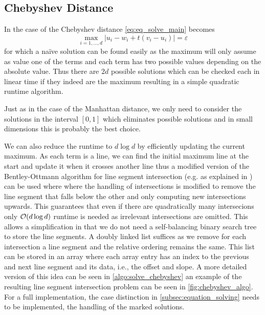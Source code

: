 \subsection{Chebyshev Distance}
\label{subsubsec:eq_chebyshev_distance}
In the case of the Chebyshev distance \cref{eq:eq_solve_main} becomes 
\begin{equation}
  \max_{i = 1,\dots, d} |u_i - w_i + t(v_i - u_i)| = \varepsilon\label{eq:solve_chebyshev}
\end{equation}
for which a na\"ive solution can be found easily as the maximum will only assume as value one of the terms and each term has two possible values depending on the absolute value. Thus there are \(2d\) possible solutions which can be checked each in linear time if they indeed are the maximum resulting in a simple quadratic runtime algorithm. 

Just as in the case of the Manhattan distance, we only need to consider the solutions in the interval \([0,1]\) which eliminates possible solutions and in small dimensions this is probably the best choice. 

We can also reduce the runtime to \(d \log d\) by efficiently updating the current maximum. As each term is a line, we can find the initial maximum line at the start and update it when it crosses another line thus a modified version of the Bentley-Ottmann algorithm for line segment intersection (e.g. as explained in \cite{computational_geometry}) can be used where where the handling of intersections is modified to remove the line segment that falls below the other and only computing new intersections upwards. This guarantees that even if there are quadratically many intersecions only \(\mathcal{O}(d \log d)\) runtime is needed as irrelevant intersections are omitted. 
This allows a simplification in that we do not need a self-balancing binary search tree to store the line segments. A doubly linked list suffices as we remove for each intersection a line segment and the relative ordering remains the same. This list can be stored in an array where each array entry has an index to the previous and next line segment and its data, i.e., the offset and slope. A more detailed version of this idea can be seen in \cref{algo:solve_chebyshev} an example of the resulting line segment intersection problem can be seen in \cref{fig:chebyshev_algo}. For a full implementation, the case distinction in \cref{subsec:equation_solving} needs to be implemented, the handling of the marked solutions.

